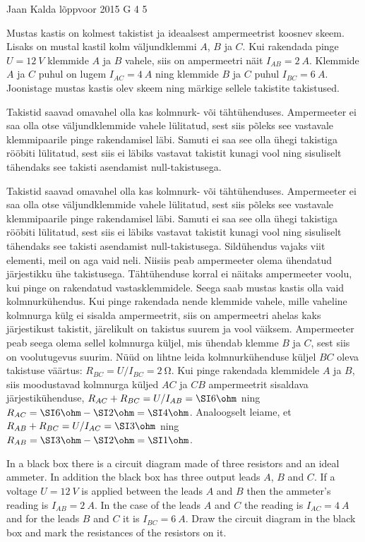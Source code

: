 {Jaan Kalda} %
{lõppvoor} %
{2015} %
{G 4} %
{5} %
{
\ifStatement
Mustas kastis on kolmest takistist ja ideaalsest ampermeetrist koosnev skeem. Lisaks on mustal kastil kolm väljundklemmi $A$, $B$ ja $C$. Kui rakendada pinge $U=\SI{12}{V}$ klemmide $A$ ja $B$ vahele, siis on ampermeetri näit $I_{AB}=\SI{2}{A}$. Klemmide $A$ ja $C$ puhul on lugem $I_{AC}=\SI{4}{A}$ ning klemmide $B$ ja $C$ puhul $I_{BC}=\SI{6}{A}$. Joonistage mustas kastis olev skeem ning märkige sellele takistite takistused.
\fi


\ifHint
Takistid saavad omavahel olla kas kolmnurk- või tähtühenduses. Ampermeeter ei saa olla otse väljundklemmide vahele lülitatud, sest siis põleks see vastavale klemmipaarile pinge rakendamisel läbi. Samuti ei saa see olla ühegi takistiga rööbiti lülitatud, sest siis ei läbiks vastavat takistit kunagi vool ning sisuliselt tähendaks see takisti asendamist null-takistusega.
\fi


\ifSolution
Takistid saavad omavahel olla kas kolmnurk- või tähtühenduses. Ampermeeter ei saa olla otse väljundklemmide vahele lülitatud, sest siis põleks see vastavale klemmipaarile pinge rakendamisel läbi. Samuti ei saa see olla ühegi takistiga rööbiti lülitatud, sest siis ei läbiks vastavat takistit kunagi vool ning sisuliselt tähendaks see takisti asendamist null-takistusega. Sildühendus vajaks viit elementi, meil on aga vaid neli. Niisiis peab ampermeeter olema ühendatud järjestikku ühe takistusega. Tähtühenduse korral ei näitaks ampermeeter voolu, kui pinge on rakendatud vastasklemmidele. Seega saab mustas kastis olla vaid kolmnurkühendus. Kui pinge rakendada nende klemmide vahele, mille vaheline kolmnurga külg ei sisalda ampermeetrit, siis on ampermeetri ahelas kaks järjestikust takistit, järelikult on takistus suurem ja vool väiksem. Ampermeeter peab seega olema sellel kolmnurga küljel, mis ühendab klemme $B$ ja $C$, sest siis on voolutugevus suurim. Nüüd on lihtne leida kolmnurkühenduse küljel $BC$ oleva 
takistuse väärtus: $R_{BC}=U/I_{BC}=\SI{2}{\ohm}$. Kui pinge rakendada klemmidele $A$ ja $B$, siis moodustavad kolmnurga küljed $AC$ ja $CB$
ampermeetrit sisaldava järjestikühenduse, $R_{AC}+R_{BC}=U/I_{AB}=\SI 6\ohm$ ning $R_{AC}=\SI 6\ohm-\SI 2\ohm=\SI 4\ohm$.
Analoogselt leiame, et $R_{AB}+R_{BC}=U/I_{AC}=\SI 3\ohm$ ning $R_{AB}=\SI 3\ohm-\SI 2\ohm=\SI 1\ohm$.
\fi


\ifEngStatement
In a black box there is a circuit diagram made of three resistors and an ideal ammeter. In addition the black box has three output leads $A$, $B$ and $C$. If a voltage $U=\SI{12}{V}$ is applied between the leads $A$ and $B$ then the ammeter’s reading is $I_{AB}=\SI{2}{A}$. In the case of the leads $A$ and $C$ the reading is $I_{AC}=\SI{4}{A}$ and for the leads $B$ and $C$ it is $I_{BC}=\SI{6}{A}$. Draw the circuit diagram in the black box and mark the resistances of the resistors on it.
\fi


}
